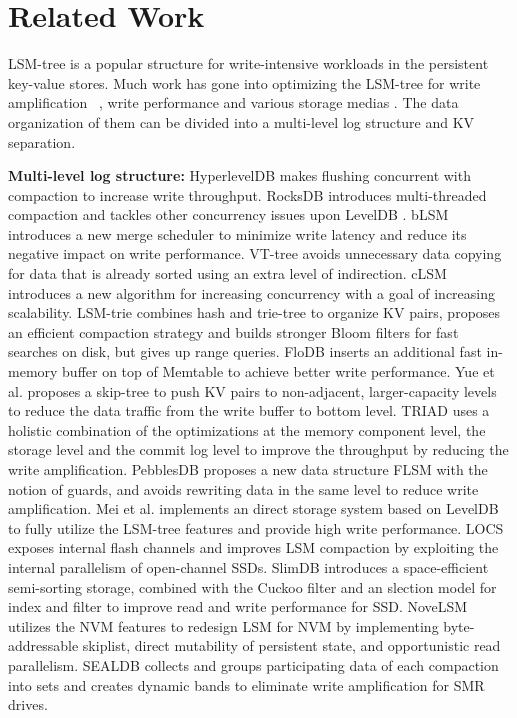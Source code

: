 \documentclass[sigconf]{acmart}
\begin{document}
\section{Related Work} \label{related}
LSM-tree \cite{LSMtree} is a popular structure for write-intensive workloads in the persistent key-value stores. Much work has gone into optimizing the LSM-tree for write amplification ~\cite{VTtree,TRIAD,PebblesDB}, write performance \cite{RocksDB,FloDB,cLSM} and various storage medias \cite{LOCS,SlimDB,NoveLSM}. The data organization of them can be divided into a multi-level log structure and KV separation.

\textbf{Multi-level log structure:} HyperlevelDB \cite{HyperLevelDB} makes flushing concurrent with compaction to increase write throughput. RocksDB \cite{RocksDB} introduces multi-threaded compaction and tackles other concurrency issues upon LevelDB \cite{LevelDB}. bLSM \cite{bLSM} introduces a new merge scheduler to minimize write latency and reduce its negative impact on write performance. VT-tree \cite{VTtree} avoids unnecessary data copying for data that is already sorted using an extra level of indirection. cLSM \cite{cLSM} introduces a new algorithm for increasing concurrency with a goal of increasing scalability. LSM-trie \cite{LSMtrie} combines hash and trie-tree to organize KV pairs, proposes an efficient compaction strategy and builds stronger Bloom filters for fast searches on disk, but gives up range queries. FloDB \cite{FloDB} inserts an additional fast in-memory buffer on top of Memtable to achieve better write performance. Yue et al. \cite{skiptree} proposes a skip-tree to push KV pairs to non-adjacent, larger-capacity levels to reduce the data traffic from the write buffer to bottom level. TRIAD \cite{TRIAD} uses a holistic combination of the optimizations at the memory component level, the storage level and the commit log level to improve the throughput by reducing the write amplification. PebblesDB \cite{PebblesDB} proposes a new data structure FLSM with the notion of guards, and avoids rewriting data in the same level to reduce write amplification. Mei et al. \cite{LDS} implements an direct storage system based on LevelDB to fully utilize the LSM-tree features and provide high write performance. LOCS\cite{LOCS} exposes internal flash channels and improves LSM compaction by exploiting the internal parallelism of open-channel SSDs. SlimDB \cite{SlimDB} introduces a space-efficient semi-sorting storage, combined with the Cuckoo filter and an slection model for index and filter to improve read and write performance for SSD. NoveLSM \cite{NoveLSM} utilizes the NVM features to redesign LSM for NVM by implementing byte-addressable skiplist, direct mutability of persistent state, and opportunistic read parallelism. SEALDB \cite{SEALDB} collects and groups participating data of each compaction into sets and creates dynamic bands to eliminate write amplification for SMR drives.
\end{document}
